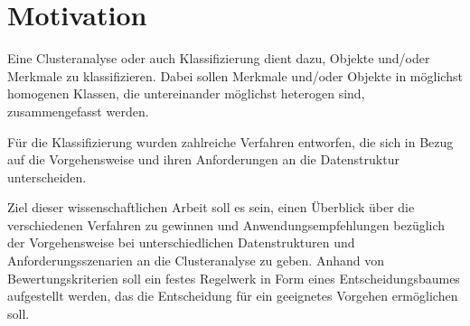 \chapter{Motivation}

Eine Clusteranalyse oder auch Klassifizierung dient dazu, Objekte und/oder Merkmale zu klassifizieren. Dabei sollen Merkmale und/oder Objekte in möglichst homogenen Klassen, die untereinander möglichst heterogen sind, zusammengefasst werden.

Für die Klassifizierung wurden zahlreiche Verfahren entworfen, die sich in Bezug auf die Vorgehensweise und ihren Anforderungen an die Datenstruktur unterscheiden.

Ziel dieser wissenschaftlichen Arbeit soll es sein, einen Überblick über die verschiedenen Verfahren zu gewinnen und Anwendungsempfehlungen bezüglich der Vorgehensweise bei unterschiedlichen Datenstrukturen und Anforderungsszenarien an die Clusteranalyse zu geben. Anhand von Bewertungskriterien soll ein festes Regelwerk in Form eines Entscheidungsbaumes aufgestellt werden, das die Entscheidung für ein geeignetes Vorgehen ermöglichen soll.